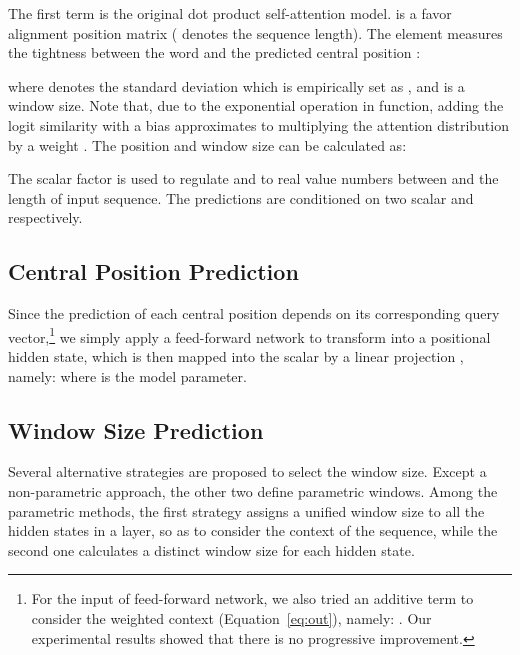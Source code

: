 \documentclass[11pt,a4paper]{article}
\begin{document}
The first term is the original dot product self-attention model.
 is a favor alignment position matrix ( denotes the sequence length). The element  measures the tightness between the word  and the predicted central position :
   
where  denotes the standard deviation which is empirically set as , and  is a window size. Note that, due to the exponential operation in  function, adding the logit similarity  with a bias  approximates to multiplying the attention distribution by a weight . The position and window size can be calculated as:

The scalar factor  is used to regulate  and  to real value numbers between  and the length of input sequence. The predictions are conditioned on two scalar  and  respectively. 



\subsection{\bf Central Position Prediction}

Since the prediction of each central position depends on its corresponding query vector,\footnote{For the input of feed-forward network, we also tried an additive term to consider the weighted context  (Equation~\ref{eq:out}), namely: . Our experimental results showed that there is no progressive improvement.} we simply apply a feed-forward network to transform  into a positional hidden state, which is then mapped into the scalar  by a linear projection , namely: 
where  is the model parameter. 











\subsection{Window Size Prediction}
\label{sec:window}
\iffalse
\begin{figure*}[t]
    \centering
    \subfigure[Non-Parametric]{
    \texttt{[image: figures/no\_param.pdf]}
    }
    \subfigure[Layer-Specific]{
    \texttt{[image: figures/layer.pdf]}
    }
    \subfigure[Query-Specific]{
    \texttt{[image: figures/query.pdf]}
    } 
\caption{    
\label{fig:models}
Architectures of the proposed models for selecting the local scope.
}
\end{figure*}
\fi
 Several alternative strategies are proposed to select the window size. Except a non-parametric approach, the other two define parametric windows. Among the parametric methods, the first strategy assigns a unified window size to all the hidden states in a layer, so as to consider the context of the sequence, while the second one calculates a distinct window size for each hidden state.
\end{document}
